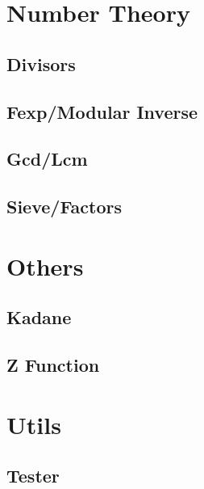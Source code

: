\section{Number Theory}
\subsection{Divisors}
\raggedbottom
\vspace{-.7\baselineskip}\hrulefill
\vspace{0.1\baselineskip}\subsection{Fexp/Modular Inverse}
\raggedbottom
\vspace{-.7\baselineskip}\hrulefill
\vspace{0.1\baselineskip}\subsection{Gcd/Lcm}
\raggedbottom
\vspace{-.7\baselineskip}\hrulefill
\vspace{0.1\baselineskip}\subsection{Sieve/Factors}
\raggedbottom
\vspace{-.7\baselineskip}\hrulefill
\vspace{0.1\baselineskip}
\section{Others}
\subsection{Kadane}
\raggedbottom
\vspace{-.7\baselineskip}\hrulefill
\vspace{0.1\baselineskip}\subsection{Z Function}
\raggedbottom
\vspace{-.7\baselineskip}\hrulefill
\vspace{0.1\baselineskip}
\section{Utils}
\subsection{Tester}
\raggedbottom
\vspace{-.7\baselineskip}\hrulefill
\vspace{0.1\baselineskip}
